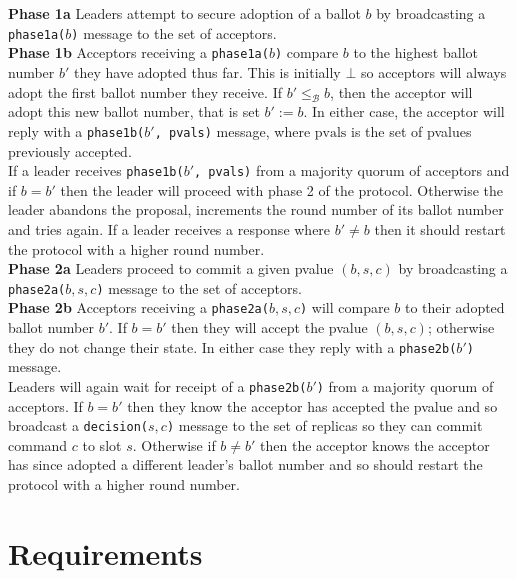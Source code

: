 \textbf{Phase 1a} Leaders attempt to secure adoption of a ballot $b$ by broadcasting a \texttt{phase1a($b$)} message to the set of acceptors. \\

\textbf{Phase 1b} Acceptors receiving a \texttt{phase1a($b$)} compare $b$ to the highest ballot number $b'$ they have adopted thus far. This is initially $\bot$ so acceptors will always adopt the first ballot number they receive. If $b' \leq_\mathcal{B} b$, then the acceptor will adopt this new ballot number, that is set $b' := b$. In either case, the acceptor will reply with a \texttt{phase1b($b'$, pvals)} message, where $\textrm{pvals}$ is the set of pvalues previously accepted. \\

If a leader receives \texttt{phase1b($b'$, pvals)} from a majority quorum of acceptors and if $b = b'$ then the leader will proceed with phase 2 of the protocol. Otherwise the leader abandons the proposal, increments the round number of its ballot number and tries again. If a leader receives a response where $b' \neq b$ then it should restart the protocol with a higher round number. \\

\textbf{Phase 2a} Leaders proceed to commit a given pvalue $\left( b, s, c \right)$ by broadcasting a \texttt{phase2a($b,s,c$)} message to the set of acceptors. \\

\textbf{Phase 2b} Acceptors receiving a \texttt{phase2a($b,s,c$)} will compare $b$ to their adopted ballot number $b'$. If $b = b'$ then they will accept the pvalue $(b,s,c)$; otherwise they do not change their state. In either case they reply with a  \texttt{phase2b($b'$)} message. \\

Leaders will again wait for receipt of a \texttt{phase2b($b'$)} from a majority quorum of acceptors. If $b = b'$ then they know the acceptor has accepted the pvalue and so broadcast a \texttt{decision($s,c$)} message to the set of replicas so they can commit command $c$ to slot $s$. Otherwise if $b \neq b'$ then the acceptor knows the acceptor has since adopted a different leader's ballot number and so should restart the protocol with a higher round number. \\
 



\section{Requirements}

